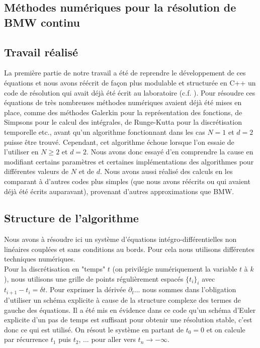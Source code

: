 \documentclass[10.5pt]{article}
\begin{document}
\begin{multicols*}{2}
\vspace*{11pt}

\section{Méthodes numériques pour la résolution de BMW continu}

\label{sec:NumContinu}

\subsection{Travail réalisé}


La première partie de notre travail a été de reprendre le développement de ces équations et nous avons réécrit de façon plus modulable et structurée en C++ un code de résolution qui avait déjà été écrit au laboratoire (c.f. ). Pour résoudre ces équations de très nombreuses méthodes numériques avaient déjà été mises en place, comme des méthodes Galerkin \cite{shen1994efficient, LeonardThesis} pour la représentation des fonctions, de Simpsons pour le calcul des intégrales, de Runge-Kutta pour la discrétisation temporelle etc., avant qu'un algorithme fonctionnant dans les cas $N=1$ et $d=2$ puisse être trouvé. Cependant, cet algorithme échoue lorsque l'on essaie de l'utiliser en $N \ge 2$ et $d=2$. Nous avons donc essayé d'en comprendre la cause en modifiant certains paramètres et certaines implémentations des algorithmes pour différentes valeurs de $N$ et de $d$. Nous avons aussi réalisé des calculs en les comparant à d'autres codes plus simples (que nous avons réécrits ou qui avaient déjà été écrits auparavant), provenant d'autres approximations que BMW. 


\subsection{Structure de l'algorithme}

Nous avons à résoudre ici un système d'équations intégro-différentielles non linéaires couplées et sans conditions au bords. Pour cela nous utilisons différentes techniques numériques. \\

Pour la discrétisation en "temps" $t$ (on privilégie numériquement la variable $t$ à $k$), nous utilisons une grille de points régulièrement espacés $\{t_i\}_i$ avec $t_{i+1} - t_i = \delta t$. Pour exprimer la dérivée $\partial_t ...$ nous sommes dans l'obligation d'utiliser un schéma explicite à cause de la structure complexe des termes de gauche des équations. Il a été mis en évidence dans ce code qu'un schéma d'Euler explicite d'un pas de temps est suffisant pour obtenir une résolution stable, c'est donc ce qui est utilisé. On résout le système en partant de $t_0 = 0$ et on calcule par récurrence $t_1$ puis $t_2$, ... pour aller vers $t_n \to - \infty$.\\


\end{multicols*}
\end{document}
